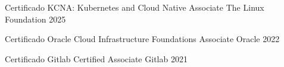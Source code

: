 

\begin{cvhonors}

\cvhonor
  {Certificado} %
  {KCNA: Kubernetes and Cloud Native Associate} %
  {The Linux Foundation} %
  {2025} %

  
\cvhonor
  {Certificado} %
  {Oracle Cloud Infrastructure Foundations Associate} %
  {Oracle} %
  {2022} %



  \cvhonor
    {Certificado} %
    {Gitlab Certified Associate} %
    {Gitlab} %
    {2021} %




\end{cvhonors}

